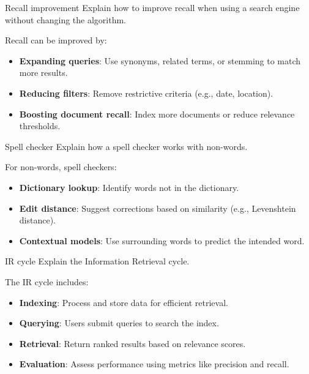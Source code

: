 \documentclass{article}
\begin{document}
\begin{exercise}{Recall improvement}
  Explain how to improve recall when using a search engine without changing the algorithm.

  \begin{solution}
    Recall can be improved by:
    \begin{itemize}
        \item \textbf{Expanding queries}: Use synonyms, related terms, or stemming to match more results.
        \item \textbf{Reducing filters}: Remove restrictive criteria (e.g., date, location).
        \item \textbf{Boosting document recall}: Index more documents or reduce relevance thresholds.
    \end{itemize}
  \end{solution}
\end{exercise}

\begin{exercise}{Spell checker}
  Explain how a spell checker works with non-words.

  \begin{solution}
    For non-words, spell checkers:
    \begin{itemize}
        \item \textbf{Dictionary lookup}: Identify words not in the dictionary.
        \item \textbf{Edit distance}: Suggest corrections based on similarity (e.g., Levenshtein distance).
        \item \textbf{Contextual models}: Use surrounding words to predict the intended word.
    \end{itemize}
  \end{solution}
\end{exercise}

\begin{exercise}{IR cycle}
  Explain the Information Retrieval cycle.

  \begin{solution}
    The IR cycle includes:
    \begin{itemize}
        \item \textbf{Indexing}: Process and store data for efficient retrieval.
        \item \textbf{Querying}: Users submit queries to search the index.
        \item \textbf{Retrieval}: Return ranked results based on relevance scores.
        \item \textbf{Evaluation}: Assess performance using metrics like precision and recall.
    \end{itemize}
  \end{solution}
\end{exercise}
\end{document}
